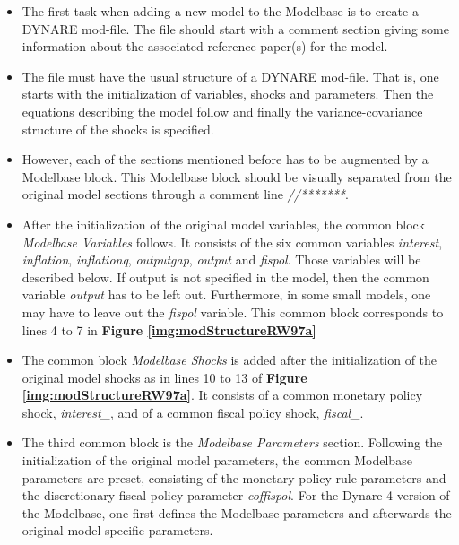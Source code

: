 \begin{itemize}
\item The first task when adding a new model to the Modelbase is to create a DYNARE mod-file. The file should start with a comment section giving some information about the associated reference paper(s) for the model.
\item The file must have the usual structure of a DYNARE mod-file. That is, one starts with the initialization of variables, shocks and parameters. Then the equations describing the model follow and finally the variance-covariance structure of the shocks is specified.
\item However, each of the sections mentioned before has to be augmented by a Modelbase block. This Modelbase block should be visually separated from the original model sections through a comment line \textit{//*******}.
\item After the initialization of the original model variables, the common block \textit{Modelbase Variables} follows. It consists of the six common variables \textit{interest}, \textit{inflation}, \textit{inflationq}, \textit{outputgap}, \textit{output} and \textit{fispol}. Those variables will be described below. If output is not specified in the model, then the common variable \textit{output} has to be left out. Furthermore, in some small models, one may have to leave out the \textit{fispol} variable. This common block corresponds to lines 4 to 7 in {\bf Figure \ref{img:modStructureRW97a}}
\item The common block \textit{Modelbase Shocks} is added after the initialization of the original model shocks as in lines 10 to 13 of {\bf Figure \ref{img:modStructureRW97a}}. It consists of a common monetary policy shock, \textit{interest\_}, and of a common fiscal policy shock, \textit{fiscal\_}.
\item The third common block is the \textit{Modelbase Parameters} section. Following the initialization of the original model parameters, the common Modelbase parameters are preset, consisting of the monetary policy rule parameters and the discretionary fiscal policy parameter \textit{coffispol}. For the Dynare 4 version of the Modelbase, one first defines the Modelbase parameters and afterwards the original model-specific parameters.

\end{itemize}
